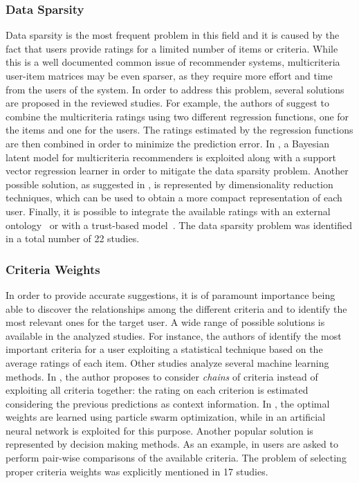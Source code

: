 \subsubsection{Data Sparsity}
Data sparsity is the most frequent problem in this field and it is caused by the fact that users provide ratings for a limited number of items or criteria. While this is a well documented common issue of recommender systems, multicriteria user-item matrices may be even sparser, as they require more effort and time from the users of the system. In order to address this problem, several solutions are proposed in the reviewed studies. For example, the authors of  suggest to combine the multicriteria ratings using two different regression functions, one for the items and one for the users. The ratings estimated by the regression functions are then combined in order to minimize the prediction error. In , a Bayesian latent model for multicriteria recommenders is exploited along with a support vector regression learner in order to mitigate the data sparsity problem. Another possible solution, as suggested in , is represented by dimensionality reduction techniques, which can be used to obtain a more compact representation of each user. Finally, it is possible to integrate the available ratings with an external ontology~ or with a trust-based model~. The data sparsity problem was identified in a total number of 22 studies.

\subsubsection{Criteria Weights}
In order to provide accurate suggestions, it is of paramount importance being able to discover the relationships among the different criteria and to identify the most relevant ones for the target user. A wide range of possible solutions is available in the analyzed studies. For instance, the authors of  identify the most important criteria for a user exploiting a statistical technique based on the average ratings of each item. Other studies analyze several machine learning methods. In , the author proposes to consider \emph{chains} of criteria instead of exploiting all criteria together: the rating on each criterion is estimated considering the previous predictions as context information. In , the optimal weights are learned using particle swarm optimization, while in  an artificial neural network is exploited for this purpose. Another popular solution is represented by decision making methods. As an example, in  users are asked to perform pair-wise comparisons of the available criteria. The problem of selecting proper criteria weights was explicitly mentioned in 17 studies.

